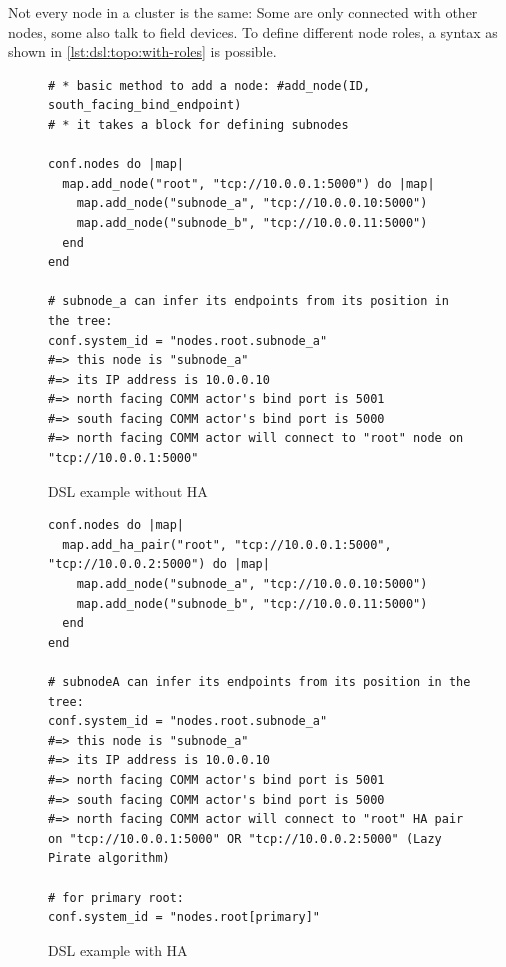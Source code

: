 Not every node in a cluster is the same: Some are only connected with other
nodes, some also talk to field devices. To define different node roles, a
syntax as shown in \autoref{lst:dsl:topo:with-roles} is possible.

\begin{figure}[]
\begin{lstlisting}[style=customruby]
# * basic method to add a node: #add_node(ID, south_facing_bind_endpoint)
# * it takes a block for defining subnodes

conf.nodes do |map|
  map.add_node("root", "tcp://10.0.0.1:5000") do |map|
    map.add_node("subnode_a", "tcp://10.0.0.10:5000")
    map.add_node("subnode_b", "tcp://10.0.0.11:5000")
  end
end

# subnode_a can infer its endpoints from its position in the tree:
conf.system_id = "nodes.root.subnode_a"
#=> this node is "subnode_a"
#=> its IP address is 10.0.0.10
#=> north facing COMM actor's bind port is 5001
#=> south facing COMM actor's bind port is 5000
#=> north facing COMM actor will connect to "root" node on "tcp://10.0.0.1:5000"
\end{lstlisting}
\caption{DSL example without HA}
\label{lst:dsl:topo:no-ha}
\end{figure}

\begin{figure}[]
\begin{lstlisting}[style=customruby]
conf.nodes do |map|
  map.add_ha_pair("root", "tcp://10.0.0.1:5000", "tcp://10.0.0.2:5000") do |map|
    map.add_node("subnode_a", "tcp://10.0.0.10:5000")
    map.add_node("subnode_b", "tcp://10.0.0.11:5000")
  end
end

# subnodeA can infer its endpoints from its position in the tree:
conf.system_id = "nodes.root.subnode_a"
#=> this node is "subnode_a"
#=> its IP address is 10.0.0.10
#=> north facing COMM actor's bind port is 5001
#=> south facing COMM actor's bind port is 5000
#=> north facing COMM actor will connect to "root" HA pair on "tcp://10.0.0.1:5000" OR "tcp://10.0.0.2:5000" (Lazy Pirate algorithm)

# for primary root:
conf.system_id = "nodes.root[primary]"
\end{lstlisting}
\caption{DSL example with HA}
\label{lst:dsl:topo:with-ha}
\end{figure}

